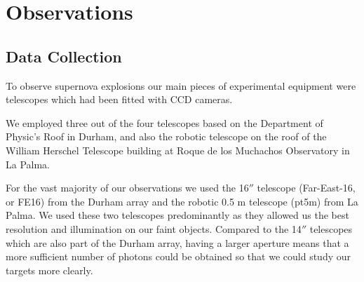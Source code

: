 \documentclass[twocolumn]{revtex4}
\begin{document}


\vspace{-3ex}
\section{Observations} 
\label{obsver}
\vspace{-2ex}
\subsection{Data Collection}
\vspace{-2ex}
To observe supernova explosions our main pieces of experimental equipment were telescopes which had been fitted with CCD cameras.

We employed three out of the four telescopes based on the Department of Physic's Roof in Durham, and also the robotic telescope on the roof of the William Herschel Telescope building at Roque de los Muchachos Observatory in La Palma.

For the vast majority of our observations we used the 16$''$ telescope (Far-East-16, or FE16) from the Durham array and the robotic 0.5 m telescope (pt5m) from La Palma. We used these two telescopes predominantly as they allowed us the best resolution and illumination on our faint objects. Compared to the 14$''$ telescopes which are also part of the Durham array, having a larger aperture means that a more sufficient number of photons could be obtained so that we could study our targets more clearly. 
\end{document}
